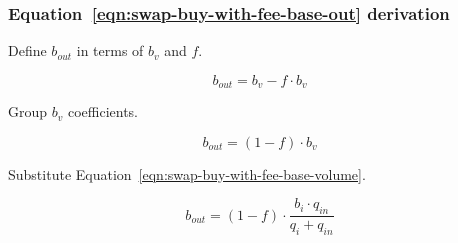 \subsubsection{Equation~\ref{eqn:swap-buy-with-fee-base-out} derivation}%
\label{sssec:equation-eqn-swap-buy-with-fee-base-out-derivation}

Define $b_{out}$ in terms of $b_v$ and $f$.

\begin{equation}
	b_{out} = b_v - f \cdot b_v \nonumber
\end{equation}

Group $b_v$ coefficients.

\begin{equation}
	b_{out} = (1 - f) \cdot b_v \nonumber
\end{equation}

Substitute Equation~\ref{eqn:swap-buy-with-fee-base-volume}.

\begin{equation}
	b_{out} = (1 - f) \cdot \frac{b_i \cdot q_{in}}{q_i + q_{in}} \nonumber
\end{equation}

